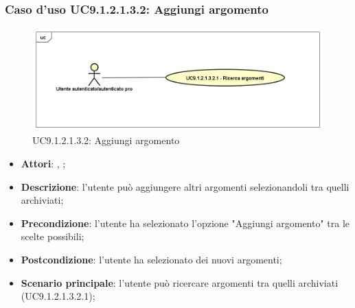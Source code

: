						\subsubsection{Caso d'uso UC9.1.2.1.3.2: Aggiungi argomento}
						\label{UC9.1.2.1.3.2}
						\begin{figure}[h]
							\centering
							\includegraphics[scale=0.5,keepaspectratio]{UML/UC9_1_2_1_3_2.png}
							\caption{UC9.1.2.1.3.2: Aggiungi argomento}
						\end{figure}
						\FloatBarrier
						\begin{itemize}
							\item \textbf{Attori}: \uau, \uaupro;
							\item \textbf{Descrizione}: l'utente può aggiungere altri argomenti selezionandoli tra quelli archiviati;  
							\item \textbf{Precondizione}: l'utente ha selezionato l'opzione "Aggiungi argomento" tra le scelte possibili;
							\item \textbf{Postcondizione}: l'utente ha selezionato dei nuovi argomenti;
							\item \textbf{Scenario principale}: l'utente può ricercare argomenti tra quelli archiviati (UC9.1.2.1.3.2.1);
						\end{itemize}
						
